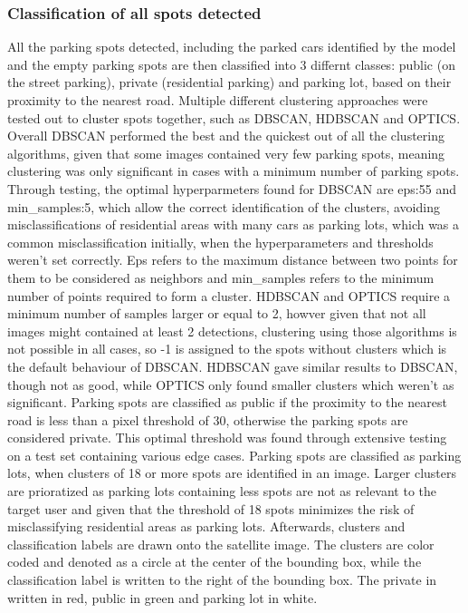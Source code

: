 \subsubsection{Classification of all spots detected}
All the parking spots detected, including the parked cars identified by the model and the empty parking spots are then classified into 3 differnt classes: public (on the street parking), private (residential parking) and parking lot, based on their proximity to the nearest road.
Multiple different clustering approaches were tested out to cluster spots together, such as DBSCAN, HDBSCAN and OPTICS.
Overall DBSCAN performed the best and the quickest out of all the clustering algorithms, given that some images contained very few parking spots, meaning clustering was only significant in cases with a minimum number of parking spots. 
Through testing, the optimal hyperparmeters found for DBSCAN are eps:55 and min_samples:5, which allow the correct identification of the clusters, avoiding misclassifications of residential areas with many cars as parking lots, which was a common misclassification initially, when the hyperparameters and thresholds weren't set correctly.
Eps refers to the maximum distance between two points for them to be considered as neighbors and min_samples refers to the minimum number of points required to form a cluster.
HDBSCAN and OPTICS require a minimum number of samples larger or equal to 2, howver given that not all images might contained at least 2 detections, clustering using those algorithms is not possible in all cases, so -1 is assigned to the spots without clusters which is the default behaviour of DBSCAN.
HDBSCAN gave similar results to DBSCAN, though not as good, while OPTICS only found smaller clusters which weren't as significant.
Parking spots are classified as public if the proximity to the nearest road is less than a pixel threshold of 30, otherwise the parking spots are considered private. This optimal threshold was found through extensive testing on a test set containing various edge cases.
Parking spots are classified as parking lots, when clusters of 18 or more spots are identified in an image. Larger clusters are prioratized as parking lots containing less spots are not as relevant to the target user and given that the threshold of 18 spots minimizes the risk of misclassifying residential areas as parking lots.
Afterwards, clusters and classification labels are drawn onto the satellite image. The clusters are color coded and denoted as a circle at the center of the bounding box, while the classification label is written to the right of the bounding box. The private in written in red, public in green and parking lot in white.

